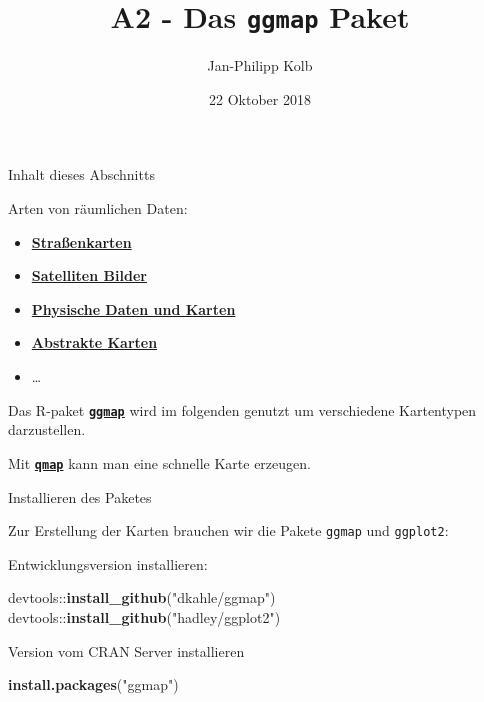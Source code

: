 \documentclass[ignorenonframetext,]{beamer}
\title{A2 - Das \texttt{ggmap} Paket}
\author{Jan-Philipp Kolb}
\date{22 Oktober 2018}
\newenvironment{Shaded}{\begin{snugshade}}{\end{snugshade}}
\newcommand{\KeywordTok}[1]{\textcolor[rgb]{0.26,0.66,0.93}{\textbf{#1}}}
\newcommand{\NormalTok}[1]{\textcolor[rgb]{0.74,0.68,0.62}{#1}}
\newcommand{\OperatorTok}[1]{\textcolor[rgb]{0.74,0.68,0.62}{#1}}
\newcommand{\StringTok}[1]{\textcolor[rgb]{0.02,0.61,0.04}{#1}}
\providecommand{\tightlist}{%
  \setlength{\itemsep}{0pt}\setlength{\parskip}{0pt}}
\begin{document}
\frame{\titlepage}

\begin{frame}[fragile]{Inhalt dieses Abschnitts}
\protect\hypertarget{inhalt-dieses-abschnitts}{}

Arten von räumlichen Daten:

\begin{itemize}
\tightlist
\item
  \href{https://www.nceas.ucsb.edu/~frazier/RSpatialGuides/ggmap/ggmapCheatsheet.pdf}{\textbf{Straßenkarten}}
\item
  \href{http://www.mostlymuppet.com/tag/maps/}{\textbf{Satelliten
  Bilder}}
\item
  \href{http://gis.stackexchange.com/questions/3083/what-makes-a-map-beautiful/45518\#45518}{\textbf{Physische
  Daten und Karten}}
\item
  \href{http://www.designfaves.com/2014/03/abstracted-maps-reveal-cities-personalities}{\textbf{Abstrakte
  Karten}}
\item
  \ldots{}
\end{itemize}

Das R-paket
\href{http://journal.r-project.org/archive/2013-1/kahle-wickham.pdf}{\textbf{\texttt{ggmap}}}
wird im folgenden genutzt um verschiedene Kartentypen darzustellen.

Mit
\href{http://www.inside-r.org/packages/cran/ggmap/docs/qmap}{\textbf{\texttt{qmap}}}
kann man eine schnelle Karte erzeugen.

\end{frame}

\begin{frame}[fragile]{Installieren des Paketes}
\protect\hypertarget{installieren-des-paketes}{}

\begin{block}{Zur Erstellung der Karten brauchen wir die Pakete
\texttt{ggmap} und \texttt{ggplot2}:}

Entwicklungsversion installieren:

\begin{Shaded}
\begin{Highlighting}[]
\NormalTok{devtools}\OperatorTok{::}\KeywordTok{install_github}\NormalTok{(}\StringTok{"dkahle/ggmap"}\NormalTok{)}
\NormalTok{devtools}\OperatorTok{::}\KeywordTok{install_github}\NormalTok{(}\StringTok{"hadley/ggplot2"}\NormalTok{)}
\end{Highlighting}
\end{Shaded}

Version vom CRAN Server installieren

\begin{Shaded}
\begin{Highlighting}[]
\KeywordTok{install.packages}\NormalTok{(}\StringTok{"ggmap"}\NormalTok{)}
\end{Highlighting}
\end{Shaded}

\end{block}

\end{frame}
\end{document}

